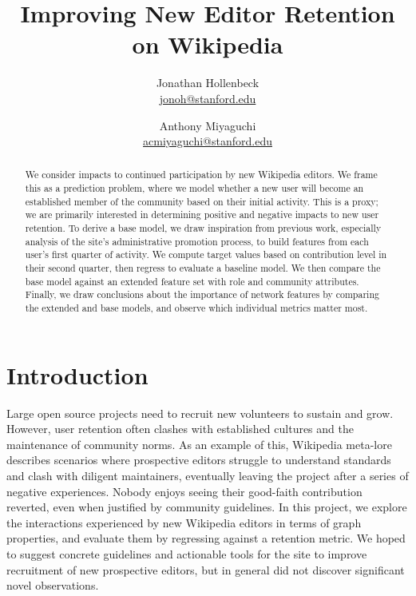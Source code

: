 \documentclass[letterpaper, 12pt, conference]{ieeeconf}
\title{Improving New Editor Retention on Wikipedia}
\author{Jonathan Hollenbeck \\ 
    \href{jonoh@stanford.edu}{jonoh@stanford.edu} 
\and Anthony Miyaguchi \\
    \href{acmiyaguchi@stanford.edu}{acmiyaguchi@stanford.edu}}
\begin{document}
\maketitle

\begin{abstract}
We consider impacts to continued participation by new Wikipedia editors. We frame this as a prediction problem, where we model whether a new user will become an established member of the community based on their initial activity. This is a proxy; we are primarily interested in determining positive and negative impacts to new user retention. To derive a base model, we draw inspiration from previous work, especially analysis\cite{burke2008mopping}\cite{leskovec2010governance} of the site's administrative promotion process, to build features from each user's first quarter of activity. We compute target values based on contribution level in their second quarter, then regress to evaluate a baseline model. We then compare the base model against an extended feature set with role and community attributes. Finally, we draw conclusions about the importance of network features by comparing the extended and base models, and observe which individual metrics matter most.

\end{abstract}

\section{Introduction}
Large open source projects need to recruit new volunteers to sustain and grow. However, user retention often clashes with established cultures and the maintenance of community norms. As an example of this, Wikipedia meta-lore\cite{wiki:deletionism} describes scenarios where prospective editors struggle to understand standards and clash with diligent maintainers, eventually leaving the project after a series of negative experiences. Nobody enjoys seeing their good-faith contribution reverted, even when justified by community guidelines. In this project, we explore the interactions experienced by new Wikipedia editors in terms of graph properties, and evaluate them by regressing against a retention metric. We hoped to suggest concrete guidelines and actionable tools for the site to improve recruitment of new prospective editors, but in general did not discover significant novel observations.
\end{document}

